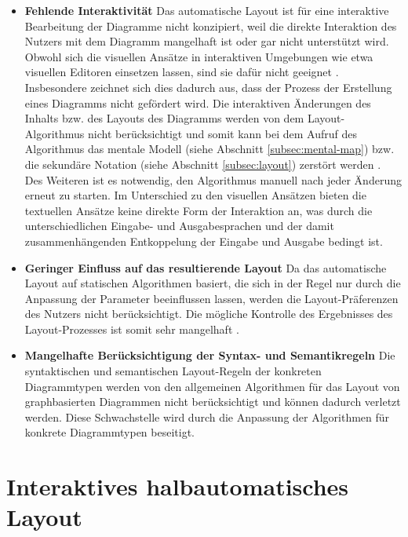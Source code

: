\begin{itemize}

\item
\textbf{Fehlende Interaktivität}
Das automatische Layout ist für eine interaktive Bearbeitung der Diagramme nicht konzipiert, weil die direkte Interaktion des Nutzers mit dem Diagramm mangelhaft ist oder gar nicht unterstützt wird. Obwohl sich die visuellen Ansätze in interaktiven Umgebungen wie etwa visuellen Editoren einsetzen lassen, sind sie dafür nicht geeignet \cite[S.22ff]{Maier12A-Pattern-based} \cite[S.4]{DwyerMarriott08Interactive}. Insbesondere zeichnet sich dies dadurch aus, dass der Prozess der Erstellung eines Diagramms nicht gefördert wird. Die interaktiven Änderungen des Inhalts bzw. des Layouts des Diagramms werden von dem Layout-Algorithmus nicht berücksichtigt und somit kann bei dem Aufruf des Algorithmus das mentale Modell (siehe Abschnitt \ref{subsec:mental-map}) bzw. die sekundäre Notation (siehe Abschnitt \ref{subsec:layout}) zerstört werden \cite{Eiglsperger04Automatic}. Des Weiteren ist es notwendig, den Algorithmus manuell nach jeder Änderung erneut zu starten. Im Unterschied zu den visuellen Ansätzen bieten die textuellen Ansätze keine direkte Form der Interaktion an, was durch die unterschiedlichen Eingabe- und Ausgabesprachen und der damit zusammenhängenden Entkoppelung der Eingabe und Ausgabe bedingt ist.

\item
\textbf{Geringer Einfluss auf das resultierende Layout}
Da das automatische Layout auf statischen Algorithmen basiert, die sich in der Regel nur durch die Anpassung der Parameter beeinflussen lassen, werden die Layout-Präferenzen des Nutzers nicht berücksichtigt. Die mögliche Kontrolle des Ergebnisses des Layout-Prozesses ist somit sehr mangelhaft \cite{GladischSchumann14Semi-Automatic}.

\item
\textbf{Mangelhafte Berücksichtigung der Syntax- und Semantikregeln}
Die syntaktischen und semantischen Layout-Regeln der konkreten Diagrammtypen werden von den allgemeinen Algorithmen für das Layout von graphbasierten Diagrammen nicht berücksichtigt und können dadurch verletzt werden. Diese Schwachstelle wird durch die Anpassung der Algorithmen für konkrete Diagrammtypen beseitigt.

\end{itemize}

\section{Interaktives halbautomatisches Layout}
\label{sec:interactive-semi-automatic-layout}

